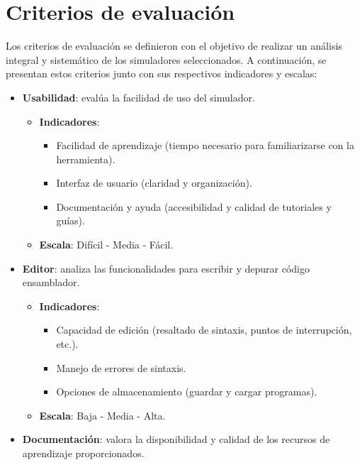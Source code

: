 \documentclass[12pt,oneside]{templates/unerthesis}
\providecommand{\tightlist}{%
  \setlength{\itemsep}{0pt}\setlength{\parskip}{0pt}}
\begin{document}
\hypertarget{criterios-de-evaluaciuxf3n}{%
\section{Criterios de evaluación}\label{criterios-de-evaluaciuxf3n}}

Los criterios de evaluación se definieron con el objetivo de realizar un análisis integral y sistemático de los simuladores seleccionados. A continuación, se presentan estos criterios junto con sus respectivos indicadores y escalas:

\begin{itemize}
\tightlist
\item
  \textbf{Usabilidad}: evalúa la facilidad de uso del simulador.

  \begin{itemize}
  \tightlist
  \item
    \textbf{Indicadores}:

    \begin{itemize}
    \tightlist
    \item
      Facilidad de aprendizaje (tiempo necesario para familiarizarse con la herramienta).
    \item
      Interfaz de usuario (claridad y organización).
    \item
      Documentación y ayuda (accesibilidad y calidad de tutoriales y guías).
    \end{itemize}
  \item
    \textbf{Escala}: Difícil - Media - Fácil.
  \end{itemize}
\item
  \textbf{Editor}: analiza las funcionalidades para escribir y depurar código ensamblador.

  \begin{itemize}
  \tightlist
  \item
    \textbf{Indicadores}:

    \begin{itemize}
    \tightlist
    \item
      Capacidad de edición (resaltado de sintaxis, puntos de interrupción, etc.).
    \item
      Manejo de errores de sintaxis.
    \item
      Opciones de almacenamiento (guardar y cargar programas).
    \end{itemize}
  \item
    \textbf{Escala}: Baja - Media - Alta.
  \end{itemize}
\item
  \textbf{Documentación}: valora la disponibilidad y calidad de los recursos de aprendizaje proporcionados.


\end{itemize}
\end{document}
